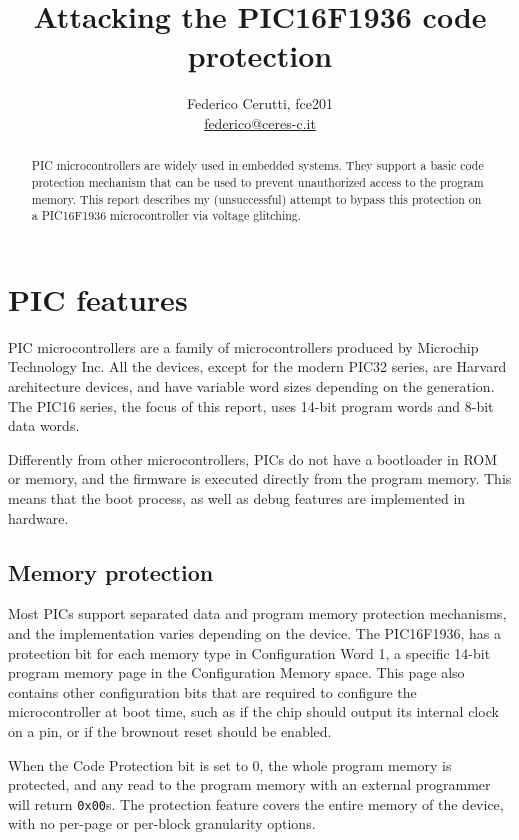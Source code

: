 \documentclass[a4paper,english,twoside,10pt]{article}
\title{Attacking the PIC16F1936 code protection}
\author{Federico Cerutti, fce201 \\\href{mailto:federico@ceres-c.it}{federico@ceres-c.it}}
\begin{document}
\maketitle%

\begin{abstract}
	PIC microcontrollers are widely used in embedded systems. They support a basic code protection mechanism that can be used to prevent unauthorized access to the program memory. This report describes my (unsuccessful) attempt to bypass this protection on a PIC16F1936 microcontroller via voltage glitching.
\end{abstract}



\section{PIC features}\label{sec:picfeatures}
PIC microcontrollers are a family of microcontrollers produced by Microchip Technology Inc. All the devices, except for the modern PIC32 series, are Harvard architecture devices, and have variable word sizes depending on the generation. The PIC16 series, the focus of this report, uses 14-bit program words and 8-bit data words.

Differently from other microcontrollers, PICs do not have a bootloader in ROM or memory, and the firmware is executed directly from the program memory. This means that the boot process, as well as debug features are implemented in hardware.

\subsection{Memory protection}\label{sec:memoryprotection}
Most PICs support separated data and program memory protection mechanisms, and the implementation varies depending on the device. The PIC16F1936, has a protection bit for each memory type in Configuration Word 1, a specific 14-bit program memory page in the Configuration Memory space. This page also contains other configuration bits that are required to configure the microcontroller at boot time, such as if the chip should output its internal clock on a pin, or if the brownout reset should be enabled.

When the Code Protection bit is set to 0, the whole program memory is protected, and any read to the program memory with an external programmer will return \texttt{0x00}s. The protection feature covers the entire memory of the device, with no per-page or per-block granularity options.
\end{document}
